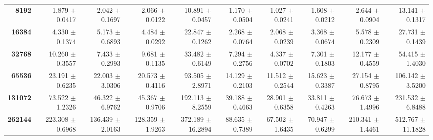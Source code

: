 \begin{tabular}{rrrrrrrrrr}
\textbf{8192}  & 1.879 $\pm$ 0.0417 & 2.042 $\pm$ 0.1697 & 2.066 $\pm$ 0.0122 & 10.891 $\pm$ 0.0457 & 1.170 $\pm$ 0.0504 & 1.027 $\pm$ 0.0241 & 1.608 $\pm$ 0.0212 & 2.644 $\pm$ 0.0904 & 13.141 $\pm$ 0.1317\\
\textbf{16384}  & 4.330 $\pm$ 0.1374 & 5.173 $\pm$ 0.6893 & 4.484 $\pm$ 0.0292 & 22.847 $\pm$ 0.1262 & 2.268 $\pm$ 0.0764 & 2.068 $\pm$ 0.0239 & 3.368 $\pm$ 0.0674 & 5.578 $\pm$ 0.2309 & 27.731 $\pm$ 0.1439\\
\textbf{32768}  & 10.260 $\pm$ 0.3557 & 7.433 $\pm$ 0.2993 & 9.681 $\pm$ 0.1135 & 33.482 $\pm$ 0.6149 & 7.294 $\pm$ 0.2756 & 4.337 $\pm$ 0.0702 & 7.301 $\pm$ 0.1803 & 12.177 $\pm$ 0.4559 & 54.415 $\pm$ 1.4030\\
\textbf{65536}  & 23.191 $\pm$ 0.6235 & 22.003 $\pm$ 3.0306 & 20.573 $\pm$ 0.4116 & 93.505 $\pm$ 2.8971 & 14.129 $\pm$ 0.2103 & 11.512 $\pm$ 0.2544 & 15.623 $\pm$ 0.3387 & 27.154 $\pm$ 0.8795 & 106.142 $\pm$ 3.5200\\
\textbf{131072}  & 73.522 $\pm$ 1.2326 & 46.322 $\pm$ 6.9762 & 45.367 $\pm$ 0.9706 & 192.113 $\pm$ 8.2559 & 39.188 $\pm$ 0.4663 & 28.901 $\pm$ 0.6358 & 33.811 $\pm$ 0.4263 & 76.673 $\pm$ 1.4996 & 231.532 $\pm$ 6.8488\\
\textbf{262144} & 223.308 $\pm$ 0.6968 & 136.439 $\pm$ 2.0163 & 128.359 $\pm$ 1.9263 & 372.189 $\pm$ 16.2894 & 88.635 $\pm$ 0.7389 & 67.502 $\pm$ 1.6435 & 70.947 $\pm$ 0.6299 & 210.341 $\pm$ 1.4461 & 512.767 $\pm$ 11.1828\\
\bottomrule
\end{tabular}
